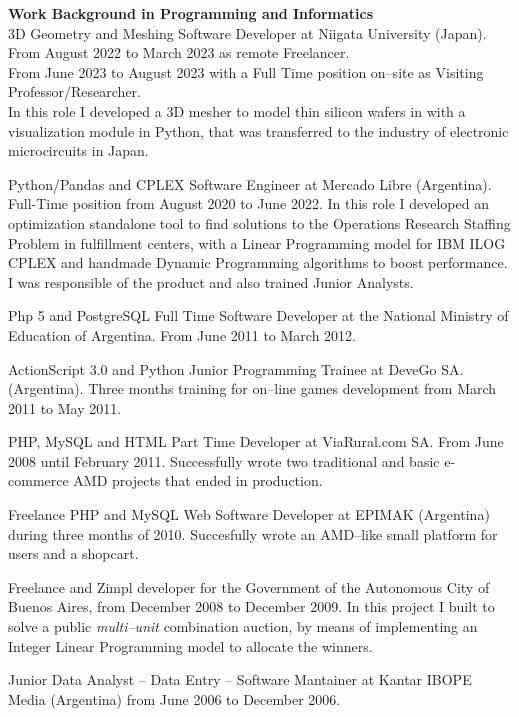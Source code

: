\textbf{Work Background in Programming and Informatics}\\[6pt]
\Cpp 3D Geometry and Meshing Software Developer at Niigata University (Japan).\\
From August 2022 to March 2023 as remote Freelancer.\\
From June 2023 to August 2023 with a Full Time position on--site as Visiting
Professor/Researcher.\\
In this role I developed a 3D mesher to model thin silicon wafers in \Cpp
with a visualization module in Python, that was transferred to the industry of
electronic microcircuits in Japan.

Python/Pandas and CPLEX Software Engineer at Mercado Libre (Argentina). 
Full-Time position from August 2020 to June 2022. In this role I developed an 
optimization standalone tool to find solutions to the
Operations Research Staffing Problem in fulfillment centers, with
a Linear Programming model for IBM ILOG CPLEX and handmade Dynamic Programming
algorithms to boost performance. I was responsible of the product and also
trained Junior Analysts.

Php 5 and PostgreSQL Full Time Software Developer at the
National Ministry of Education of Argentina. From June 2011 to
March 2012. 

ActionScript 3.0 and Python Junior Programming Trainee at DeveGo SA. (Argentina).
Three months training for on--line games development from March 2011 to May 2011.

PHP, MySQL and HTML Part Time Developer at ViaRural.com SA. From June 2008
until February 2011.
Successfully wrote two traditional and basic e-commerce AMD projects
that ended in production.

Freelance PHP and MySQL Web Software Developer at EPIMAK (Argentina)
during three months of 2010. Succesfully wrote an AMD--like small 
platform for users and a shopcart.

Freelance \Cpp and Zimpl developer for the Government of the 
Autonomous City of Buenos Aires, from December 2008 to December 2009. 
In this project I built \href{https://github.com/alexisjawtu/ilp_auction}
{\color{blue}{an optimization software}} to solve a public
\emph{multi--unit} combination auction, by means of implementing
an Integer Linear Programming model to allocate the winners.

Junior Data Analyst -- Data Entry -- Software Mantainer at Kantar IBOPE
Media (Argentina) from June 2006 to December 2006.


